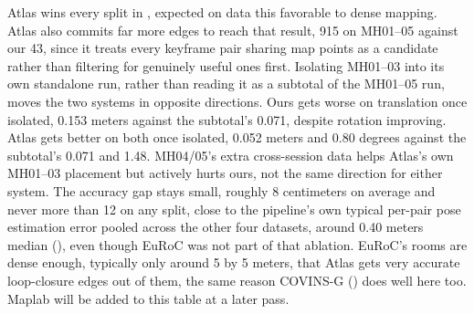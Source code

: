 Atlas wins every split in , expected on data this
favorable to dense mapping. Atlas also commits
far more edges to reach that result, 915 on MH01--05 against our 43, since it treats every
keyframe pair sharing map points as a candidate rather than filtering for genuinely useful ones
first. Isolating MH01--03 into its own standalone run, rather than reading it as a subtotal of the
MH01--05 run, moves the two systems in opposite directions. Ours gets worse on translation once
isolated, 0.153 meters against the subtotal's 0.071, despite rotation improving. Atlas gets better
on both once isolated, 0.052 meters and 0.80 degrees against the subtotal's 0.071 and 1.48.
MH04/05's extra cross-session data helps Atlas's own MH01--03 placement but actively hurts ours,
not the same direction for either system. The accuracy gap stays small, roughly 8 centimeters on
average and never more than 12 on any split, close to the pipeline's own typical per-pair pose
estimation error pooled across the other four datasets, around 0.40 meters median
(), even though EuRoC was not part of that ablation. EuRoC's
rooms are dense enough, typically only around 5 by 5 meters, that Atlas gets very accurate
loop-closure edges out of them, the same reason COVINS-G ()
does well here too. Maplab will be added to this table at a later pass.

